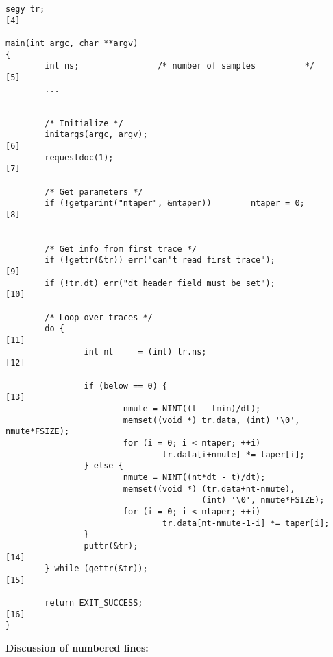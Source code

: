 {{{{{{{{\begin{verbatim}
segy tr;                                                             [4]

main(int argc, char **argv)
{
        int ns;                /* number of samples          */      [5]
        ...


        /* Initialize */                 
        initargs(argc, argv);                                        [6]
        requestdoc(1);                                               [7]

        /* Get parameters */
        if (!getparint("ntaper", &ntaper))        ntaper = 0;        [8]

                                                
        /* Get info from first trace */
        if (!gettr(&tr)) err("can't read first trace");              [9]
        if (!tr.dt) err("dt header field must be set");              [10]

        /* Loop over traces */
        do {                                                         [11]
                int nt     = (int) tr.ns;                            [12]

                if (below == 0) {                                    [13]
                        nmute = NINT((t - tmin)/dt);
                        memset((void *) tr.data, (int) '\0', nmute*FSIZE);
                        for (i = 0; i < ntaper; ++i)
                                tr.data[i+nmute] *= taper[i];
                } else {
                        nmute = NINT((nt*dt - t)/dt);
                        memset((void *) (tr.data+nt-nmute),
                                        (int) '\0', nmute*FSIZE);
                        for (i = 0; i < ntaper; ++i)
                                tr.data[nt-nmute-1-i] *= taper[i];
                }
                puttr(&tr);                                           [14]
        } while (gettr(&tr));                                         [15]
        
        return EXIT_SUCCESS;                                          [16]
}
\end{verbatim}}\noindent
{\bf Discussion of numbered lines:}

}}}}}}}

